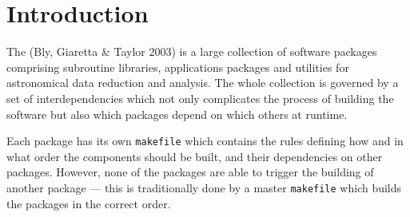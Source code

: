 %
%

\section{Introduction}

The  (Bly, Giaretta \& Taylor 2003)
is a large collection of
software packages comprising subroutine libraries, applications
packages and utilities for astronomical data reduction and analysis.
The whole collection is governed by a set of interdependencies which
not only complicates the process of building the software but also
which packages depend on which others at runtime.

Each package has its own {\tt{makefile}} which contains the rules
defining how and in what order the components should be built, and
their dependencies on other packages.  However, none of the packages
are able to trigger the building of another package --- this is
traditionally done by a master {\tt{makefile}} which builds the
packages in the correct order.

